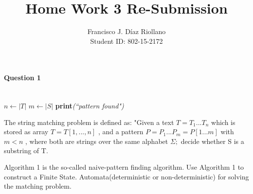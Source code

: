 \documentclass{report}
\title{Home Work 3 Re-Submission}
\author{Francisco J. Díaz Riollano \\ Student ID: 802-15-2172 }
\newcommand{\me}[1]{
\begin{math}
#1
\end{math}
}
\begin{document}
\maketitle
\paragraph{\Large{Question 1\\ \\}}


\begin{algorithm}
  \begin{algorithmic}[1]
      \State $n\gets |T|$
      \State $m\gets |S|$
      	\State \textbf{print}\textit{(``pattern found")}
      \EndIf
      \EndFor     
    \EndProcedure
  \end{algorithmic}
\end{algorithm}


The string matching problem is defined as: "Given a text \me{T=T_1 ... T_n} which is stored as array \me{T= T[1,...,n]} , and a pattern \me{P = P_1 ... P_m = P[1...m]} with \me{m<n}, where both are strings over the same alphabet \me{\Sigma;}decide whether S is a substring of T.

Algorithm 1 is the so-called naive-pattern finding algorithm. Use Algorithm 1 to construct a Finite State. Automata(deterministic or non-deterministic) for solving the matching problem. 
\\
\end{document}
